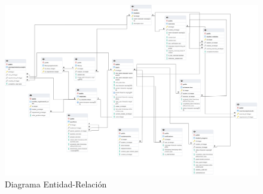 \newpage

\begin{figure}[H]
    \centering
    \begin{sideways}
        \includegraphics[width=1.8\textwidth]{imagenes/er.png}
    \end{sideways}
    \caption{Diagrama Entidad-Relación}
    \label{fig:erdiagram}
\end{figure}